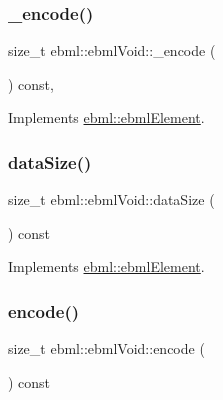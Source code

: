 \mbox{\label{classebml_1_1ebmlVoid_a58183338cb3b41b188cddfbb09a281d5}} 
\subsubsection{\texorpdfstring{\+\_\+encode()}{\_encode()}}
{\footnotesize\ttfamily size\+\_\+t ebml\+::ebml\+Void\+::\+\_\+encode (\begin{DoxyParamCaption}\item[{char $\ast$}]{ }\end{DoxyParamCaption}) const\hspace{0.3cm}{\ttfamily [protected]}, {\ttfamily [virtual]}}



Implements \mbox{\hyperlink{classebml_1_1ebmlElement_a27bd9de14e1706840235b68331917776}{ebml\+::ebml\+Element}}.

\mbox{\label{classebml_1_1ebmlVoid_a9801f10eb9f0a5449fa39d8a31dbf315}} 
\subsubsection{\texorpdfstring{data\+Size()}{dataSize()}}
{\footnotesize\ttfamily size\+\_\+t ebml\+::ebml\+Void\+::data\+Size (\begin{DoxyParamCaption}{ }\end{DoxyParamCaption}) const\hspace{0.3cm}{\ttfamily [virtual]}}



Implements \mbox{\hyperlink{classebml_1_1ebmlElement_a47ed4167d9c69104e02b6dbad0cd1fef}{ebml\+::ebml\+Element}}.

\mbox{\label{classebml_1_1ebmlVoid_ac822d7bf461ef44812596a34cccb134a}} 
\subsubsection{\texorpdfstring{encode()}{encode()}}
{\footnotesize\ttfamily size\+\_\+t ebml\+::ebml\+Void\+::encode (\begin{DoxyParamCaption}\item[{\mbox{\hyperlink{classebml_1_1ioBase}{io\+Base}} $\ast$}]{ }\end{DoxyParamCaption}) const\hspace{0.3cm}{\ttfamily [virtual]}}



